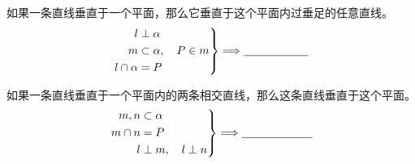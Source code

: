 \documentclass{exam-zh}
\begin{document}

\begin{problem}[points=5]
  \noindent
  \begin{minipage}[t]{\dimexpr\linewidth-55mm-6mm\relax}
    \vspace{0pt}
    如果一条直线垂直于一个平面，那么它垂直于这个平面内过垂足的任意直线。
\[
\left.
\begin{aligned}
l&\perp\alpha\\
m&\subset\alpha,\quad P\in m\\
l\cap\alpha&=P
\end{aligned}
\right\}
\Longrightarrow
\underline{\hspace{20mm}}
\]


  \end{minipage}\hfill
  \begin{diagramcoltikz}{55mm}{}
  }
  \end{diagramcoltikz}
  \par\medskip
\end{problem}



\begin{problem}[points=5]
  \noindent
  \begin{minipage}[t]{\dimexpr\linewidth-55mm-6mm\relax}
    \vspace{0pt}
    如果一条直线垂直于一个平面内的两条相交直线，那么这条直线垂直于这个平面。
\[
\left.
\begin{aligned}
m,n&\subset\alpha\\
m\cap n&=P\\
l&\perp m,\quad l\perp n
\end{aligned}
\right\}
\Longrightarrow
\underline{\hspace{22mm}}
\]


  \end{minipage}\hfill
  \begin{diagramcoltikz}{55mm}{}
  }
  \end{diagramcoltikz}
  \par\medskip
\end{problem}


\end{document}
